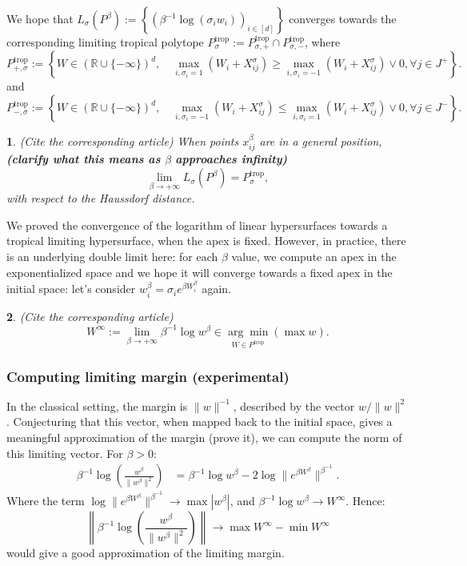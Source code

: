 \documentclass[oneside,english]{amsart}
\numberwithin{equation}{section}
\numberwithin{figure}{section}
\theoremstyle{plain}
\newtheorem{thm}{\protect\theoremname}
\theoremstyle{definition}
\theoremstyle{plain}
\theoremstyle{remark}
\theoremstyle{plain}
\theoremstyle{definition}
\theoremstyle{definition}
\providecommand{\theoremname}{Theorem}
\begin{document}
We hope that $L_{\sigma}(P^{\beta}):=\left\{ (\beta^{-1}\log(\sigma_{i}w_{i}))_{i\in[d]}\right\} $
converges towards the corresponding limiting tropical polytope $P_{\sigma}^{\text{trop}}:=P_{\sigma,+}^{\text{trop}}\cap P_{\sigma,-}^{\text{trop}}$,
where 
\[
P_{+,\sigma}^{\text{trop}}:=\left\{ W\in(\mathbb{R}\cup\{-\infty\})^{d},\quad\max_{i,\sigma_{i}=1}(W_{i}+X_{ij}^{\sigma})\ge\max_{i,\sigma_{i}=-1}(W_{i}+X_{ij}^{\sigma})\vee0,\forall j\in J^{+}\right\} .
\]
and 
\[
P_{-,\sigma}^{\text{trop}}:=\left\{ W\in(\mathbb{R}\cup\{-\infty\})^{d},\quad\max_{i,\sigma_{i}=-1}(W_{i}+X_{ij}^{\sigma})\le\max_{i,\sigma_{i}=1}(W_{i}+X_{ij}^{\sigma})\vee0,\forall j\in J^{-}\right\} .
\]

\begin{thm}
(Cite the corresponding article) When points $x_{ij}^{\beta}$ are
in a general position, \textbf{(clarify what this means as $\beta$}
\textbf{approaches infinity)} 
\[
\lim_{\beta\rightarrow+\infty}L_{\sigma}(P^{\beta})=P_{\sigma}^{\text{trop}},
\]
with respect to the Haussdorf distance. 
\end{thm}

We proved the convergence of the logarithm of linear hypersurfaces
towards a tropical limiting hypersurface, when the apex is fixed.
However, in practice, there is an underlying double limit here: for
each $\beta$ value, we compute an apex in the exponentialized space
and we hope it will converge towards a fixed apex in the initial space:
let's consider $w_{i}^{\beta}=\sigma_{i}e^{\beta W_{i}^{\beta}}$
again. 
\begin{thm}
(Cite the corresponding article) 
\[
W^{\infty}:=\lim_{\beta\rightarrow+\infty}\beta^{-1}\log w^{\beta}\in\underset{W\in P^{\text{trop}}}{\arg\min}\left(\max w\right).
\]
\end{thm}


\subsubsection{Computing limiting margin (experimental)}

In the classical setting, the margin is $\lVert w\rVert^{-1}$, described
by the vector $w/\lVert w\rVert^{2}$. Conjecturing that this vector,
when mapped back to the initial space, gives a meaningful approximation
of the margin (prove it), we can compute the norm of this limiting
vector. For $\beta>0$: 
\begin{align*}
\beta^{-1}\log\left(\frac{w^{\beta}}{\lVert w^{\beta}\rVert^{2}}\right) & =\beta^{-1}\log w^{\beta}-2\log\lVert e^{\beta W^{\beta}}\rVert^{\beta^{-1}}.
\end{align*}
Where the term $\log\lVert e^{\beta W^{\beta}}\rVert^{\beta^{-1}}\rightarrow\max\left|w^{\beta}\right|$,
and $\beta^{-1}\log w^{\beta}\rightarrow W^{\infty}$. Hence: 
\[
\left\lVert \beta^{-1}\log\left(\frac{w^{\beta}}{\lVert w^{\beta}\rVert^{2}}\right)\right\rVert \longrightarrow\max W^{\infty}-\min W^{\infty}
\]
would give a good approximation of the limiting margin.

\newpage{} 

\end{document}

